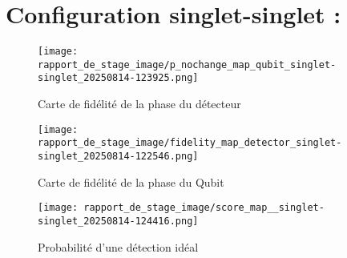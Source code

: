 \documentclass{article}
\begin{document}
\section*{Configuration singlet-singlet :}

\begin{figure}[H]
    \centering
    \begin{minipage}[c]{0.48\textwidth}
        \centering
        \texttt{[image: rapport\_de\_stage\_image/p\_nochange\_map\_qubit\_singlet-singlet\_20250814-123925.png]}
        \caption{Carte de fidélité de la phase du détecteur}
        \label{fig:fidelity_map_1}
    \end{minipage}
    \hfill
    \begin{minipage}[c]{0.48\textwidth}
        \centering
        \texttt{[image: rapport\_de\_stage\_image/fidelity\_map\_detector\_singlet-singlet\_20250814-122546.png]}
        \caption{Carte de fidélité de la phase du Qubit}
        \label{fig:fidelity_map_2}
    \end{minipage}
    
    \centering
    \texttt{[image: rapport\_de\_stage\_image/score\_map\_\_singlet-singlet\_20250814-124416.png]}
    \caption{Probabilité d'une détection idéal}
    \label{fig:fidelity_map_detector}
\end{figure}
\end{document}
